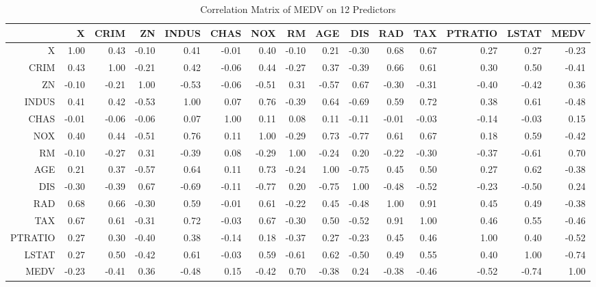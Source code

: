 \documentclass[]{article}
\begin{document}
\begin{table}[!h]
\centering
\caption{Correlation Matrix of MEDV on 12 Predictors} 
\begingroup\fontsize{8.5pt}{10pt}\selectfont
\begin{tabular}{rrrrrrrrrrrrrrr}
  \hline
 & X & CRIM & ZN & INDUS & CHAS & NOX & RM & AGE & DIS & RAD & TAX & PTRATIO & LSTAT & MEDV \\ 
  \hline
X & 1.00 & 0.43 & -0.10 & 0.41 & -0.01 & 0.40 & -0.10 & 0.21 & -0.30 & 0.68 & 0.67 & 0.27 & 0.27 & -0.23 \\ 
  CRIM & 0.43 & 1.00 & -0.21 & 0.42 & -0.06 & 0.44 & -0.27 & 0.37 & -0.39 & 0.66 & 0.61 & 0.30 & 0.50 & -0.41 \\ 
  ZN & -0.10 & -0.21 & 1.00 & -0.53 & -0.06 & -0.51 & 0.31 & -0.57 & 0.67 & -0.30 & -0.31 & -0.40 & -0.42 & 0.36 \\ 
  INDUS & 0.41 & 0.42 & -0.53 & 1.00 & 0.07 & 0.76 & -0.39 & 0.64 & -0.69 & 0.59 & 0.72 & 0.38 & 0.61 & -0.48 \\ 
  CHAS & -0.01 & -0.06 & -0.06 & 0.07 & 1.00 & 0.11 & 0.08 & 0.11 & -0.11 & -0.01 & -0.03 & -0.14 & -0.03 & 0.15 \\ 
  NOX & 0.40 & 0.44 & -0.51 & 0.76 & 0.11 & 1.00 & -0.29 & 0.73 & -0.77 & 0.61 & 0.67 & 0.18 & 0.59 & -0.42 \\ 
  RM & -0.10 & -0.27 & 0.31 & -0.39 & 0.08 & -0.29 & 1.00 & -0.24 & 0.20 & -0.22 & -0.30 & -0.37 & -0.61 & 0.70 \\ 
  AGE & 0.21 & 0.37 & -0.57 & 0.64 & 0.11 & 0.73 & -0.24 & 1.00 & -0.75 & 0.45 & 0.50 & 0.27 & 0.62 & -0.38 \\ 
  DIS & -0.30 & -0.39 & 0.67 & -0.69 & -0.11 & -0.77 & 0.20 & -0.75 & 1.00 & -0.48 & -0.52 & -0.23 & -0.50 & 0.24 \\ 
  RAD & 0.68 & 0.66 & -0.30 & 0.59 & -0.01 & 0.61 & -0.22 & 0.45 & -0.48 & 1.00 & 0.91 & 0.45 & 0.49 & -0.38 \\ 
  TAX & 0.67 & 0.61 & -0.31 & 0.72 & -0.03 & 0.67 & -0.30 & 0.50 & -0.52 & 0.91 & 1.00 & 0.46 & 0.55 & -0.46 \\ 
  PTRATIO & 0.27 & 0.30 & -0.40 & 0.38 & -0.14 & 0.18 & -0.37 & 0.27 & -0.23 & 0.45 & 0.46 & 1.00 & 0.40 & -0.52 \\ 
  LSTAT & 0.27 & 0.50 & -0.42 & 0.61 & -0.03 & 0.59 & -0.61 & 0.62 & -0.50 & 0.49 & 0.55 & 0.40 & 1.00 & -0.74 \\ 
  MEDV & -0.23 & -0.41 & 0.36 & -0.48 & 0.15 & -0.42 & 0.70 & -0.38 & 0.24 & -0.38 & -0.46 & -0.52 & -0.74 & 1.00 \\ 
   \hline
\end{tabular}
\endgroup
\end{table}
\end{document}

